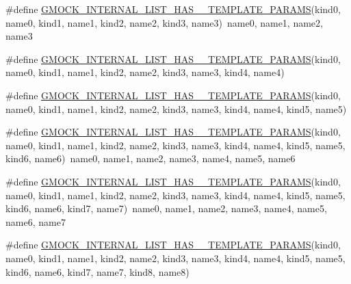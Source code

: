 \begin{DoxyCompactItemize}
\item 
\#define \mbox{\hyperlink{googletest-master_2googlemock_2include_2gmock_2gmock-generated-actions_8h_a6b509ec43356784c0bb70056dcd2c5a2}{G\+M\+O\+C\+K\+\_\+\+I\+N\+T\+E\+R\+N\+A\+L\+\_\+\+L\+I\+S\+T\+\_\+\+H\+A\+S\+\_\+\_\+\+T\+E\+M\+P\+L\+A\+T\+E\+\_\+\+P\+A\+R\+A\+MS}}(kind0,  name0,  kind1,  name1,  kind2,  name2,  kind3,  name3)~name0, name1, name2, name3
\item 
\#define \mbox{\hyperlink{googletest-master_2googlemock_2include_2gmock_2gmock-generated-actions_8h_ad9010efd4cfd9c4874d18fef3aee7676}{G\+M\+O\+C\+K\+\_\+\+I\+N\+T\+E\+R\+N\+A\+L\+\_\+\+L\+I\+S\+T\+\_\+\+H\+A\+S\+\_\+\_\+\+T\+E\+M\+P\+L\+A\+T\+E\+\_\+\+P\+A\+R\+A\+MS}}(kind0,  name0,  kind1,  name1,  kind2,  name2,  kind3,  name3,  kind4,  name4)
\item 
\#define \mbox{\hyperlink{googletest-master_2googlemock_2include_2gmock_2gmock-generated-actions_8h_ae9d4c983c2aba6b0fa5725118bb11cbd}{G\+M\+O\+C\+K\+\_\+\+I\+N\+T\+E\+R\+N\+A\+L\+\_\+\+L\+I\+S\+T\+\_\+\+H\+A\+S\+\_\+\_\+\+T\+E\+M\+P\+L\+A\+T\+E\+\_\+\+P\+A\+R\+A\+MS}}(kind0,  name0,  kind1,  name1,  kind2,  name2,  kind3,  name3,  kind4,  name4,  kind5,  name5)
\item 
\#define \mbox{\hyperlink{googletest-master_2googlemock_2include_2gmock_2gmock-generated-actions_8h_ad76d91a49b437e52790b3d7efeb6f289}{G\+M\+O\+C\+K\+\_\+\+I\+N\+T\+E\+R\+N\+A\+L\+\_\+\+L\+I\+S\+T\+\_\+\+H\+A\+S\+\_\+\_\+\+T\+E\+M\+P\+L\+A\+T\+E\+\_\+\+P\+A\+R\+A\+MS}}(kind0,  name0,  kind1,  name1,  kind2,  name2,  kind3,  name3,  kind4,  name4,  kind5,  name5,  kind6,  name6)~name0, name1, name2, name3, name4, name5, name6
\item 
\#define \mbox{\hyperlink{googletest-master_2googlemock_2include_2gmock_2gmock-generated-actions_8h_a1080c34f9f1d183b54b4b710b5a6e98d}{G\+M\+O\+C\+K\+\_\+\+I\+N\+T\+E\+R\+N\+A\+L\+\_\+\+L\+I\+S\+T\+\_\+\+H\+A\+S\+\_\+\_\+\+T\+E\+M\+P\+L\+A\+T\+E\+\_\+\+P\+A\+R\+A\+MS}}(kind0,  name0,  kind1,  name1,  kind2,  name2,  kind3,  name3,  kind4,  name4,  kind5,  name5,  kind6,  name6,  kind7,  name7)~name0, name1, name2, name3, name4, name5, name6, name7
\item 
\#define \mbox{\hyperlink{googletest-master_2googlemock_2include_2gmock_2gmock-generated-actions_8h_a2492e9cf6abea9975cc7703e24fb4409}{G\+M\+O\+C\+K\+\_\+\+I\+N\+T\+E\+R\+N\+A\+L\+\_\+\+L\+I\+S\+T\+\_\+\+H\+A\+S\+\_\+\_\+\+T\+E\+M\+P\+L\+A\+T\+E\+\_\+\+P\+A\+R\+A\+MS}}(kind0,  name0,  kind1,  name1,  kind2,  name2,  kind3,  name3,  kind4,  name4,  kind5,  name5,  kind6,  name6,  kind7,  name7,  kind8,  name8)

\end{DoxyCompactItemize}
